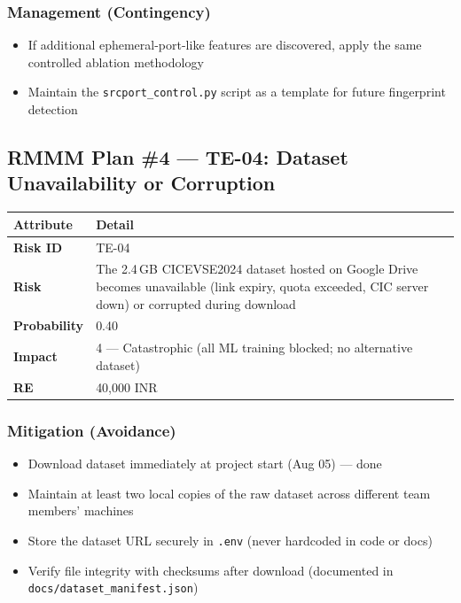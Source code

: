 \documentclass[11pt, a4paper]{article}
\newcommand{\cmark}{\textcolor{accent}{\ding{51}}}
\newcommand{\col}[1]{\texttt{\small #1}}
\begin{document}
\subsubsection*{Management (Contingency)}
\begin{itemize}[leftmargin=*]
    \item If additional ephemeral-port-like features are discovered, apply the same controlled ablation methodology
    \item Maintain the \col{srcport\_control.py} script as a template for future fingerprint detection
\end{itemize}

\subsection{RMMM Plan \#4 --- TE-04: Dataset Unavailability or Corruption}

\begin{center}
\small
\begin{tabular}{|l|p{10cm}|}
\hline
\rowcolor{red!10}
\textbf{Attribute} & \textbf{Detail} \\
\hline
\textbf{Risk ID} & TE-04 \\
\hline
\textbf{Risk} & The 2.4\,GB CICEVSE2024 dataset hosted on Google Drive becomes unavailable (link expiry, quota exceeded, CIC server down) or corrupted during download \\
\hline
\textbf{Probability} & 0.40 \\
\hline
\textbf{Impact} & 4 --- Catastrophic (all ML training blocked; no alternative dataset) \\
\hline
\textbf{RE} & 40,000 INR \\
\hline
\end{tabular}
\normalsize
\end{center}

\subsubsection*{Mitigation (Avoidance)}
\begin{itemize}[leftmargin=*]
    \item Download dataset immediately at project start (Aug 05) --- done \cmark{}
    \item Maintain at least two local copies of the raw dataset across different team members' machines
    \item Store the dataset URL securely in \col{.env} (never hardcoded in code or docs)
    \item Verify file integrity with checksums after download (documented in \col{docs/dataset\_manifest.json})
\end{itemize}
\end{document}

